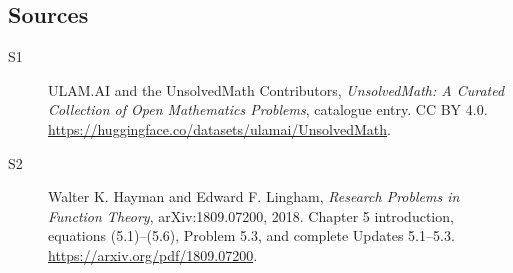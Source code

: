 \documentclass[11pt]{book}
\begin{document}
\subsection{Sources}
\begin{description}
\item[\hypertarget{source:statement:1}{S1}] ULAM.AI and the UnsolvedMath Contributors, \emph{UnsolvedMath: A Curated Collection of Open Mathematics Problems}, catalogue entry. CC BY 4.0. \url{https://huggingface.co/datasets/ulamai/UnsolvedMath}.
\item[\hypertarget{source:statement:2}{S2}] Walter K. Hayman and Edward F. Lingham, \emph{Research Problems in Function Theory}, arXiv:1809.07200, 2018. Chapter 5 introduction, equations (5.1)--(5.6), Problem 5.3, and complete Updates 5.1--5.3. \url{https://arxiv.org/pdf/1809.07200}.
\end{description}
\label{end:statement}
\end{document}
